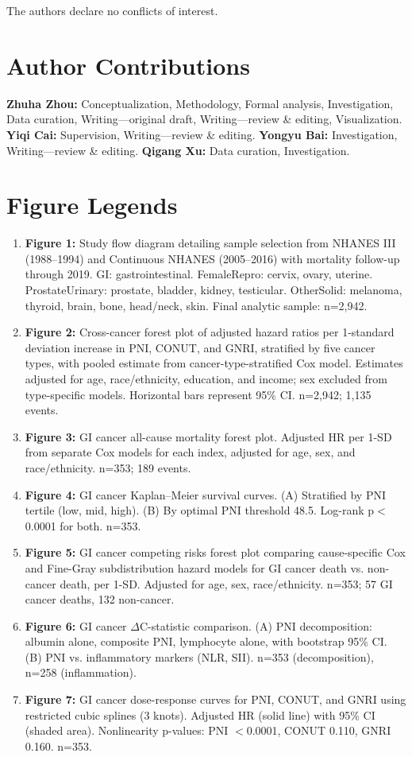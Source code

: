 \documentclass[review]{elsarticle}
\begin{document}
The authors declare no conflicts of interest.

\section*{Author Contributions}

\textbf{Zhuha Zhou:} Conceptualization, Methodology, Formal analysis, Investigation, Data curation, Writing---original draft, Writing---review \& editing, Visualization. \textbf{Yiqi Cai:} Supervision, Writing---review \& editing. \textbf{Yongyu Bai:} Investigation, Writing---review \& editing. \textbf{Qigang Xu:} Data curation, Investigation.

\section*{Figure Legends}

\begin{enumerate}
  \item \textbf{Figure 1:} Study flow diagram detailing sample selection from NHANES III (1988--1994) and Continuous NHANES (2005--2016) with mortality follow-up through 2019. GI: gastrointestinal. FemaleRepro: cervix, ovary, uterine. ProstateUrinary: prostate, bladder, kidney, testicular. OtherSolid: melanoma, thyroid, brain, bone, head/neck, skin. Final analytic sample: n=2,942.
  \item \textbf{Figure 2:} Cross-cancer forest plot of adjusted hazard ratios per 1-standard deviation increase in PNI, CONUT, and GNRI, stratified by five cancer types, with pooled estimate from cancer-type-stratified Cox model. Estimates adjusted for age, race/ethnicity, education, and income; sex excluded from type-specific models. Horizontal bars represent 95\% CI. n=2,942; 1,135 events.
  \item \textbf{Figure 3:} GI cancer all-cause mortality forest plot. Adjusted HR per 1-SD from separate Cox models for each index, adjusted for age, sex, and race/ethnicity. n=353; 189 events.
  \item \textbf{Figure 4:} GI cancer Kaplan--Meier survival curves. (A) Stratified by PNI tertile (low, mid, high). (B) By optimal PNI threshold 48.5. Log-rank p$<$0.0001 for both. n=353.
  \item \textbf{Figure 5:} GI cancer competing risks forest plot comparing cause-specific Cox and Fine-Gray subdistribution hazard models for GI cancer death vs. non-cancer death, per 1-SD. Adjusted for age, sex, race/ethnicity. n=353; 57 GI cancer deaths, 132 non-cancer.
  \item \textbf{Figure 6:} GI cancer $\Delta$C-statistic comparison. (A) PNI decomposition: albumin alone, composite PNI, lymphocyte alone, with bootstrap 95\% CI. (B) PNI vs. inflammatory markers (NLR, SII). n=353 (decomposition), n=258 (inflammation).
  \item \textbf{Figure 7:} GI cancer dose-response curves for PNI, CONUT, and GNRI using restricted cubic splines (3 knots). Adjusted HR (solid line) with 95\% CI (shaded area). Nonlinearity p-values: PNI $<$0.0001, CONUT 0.110, GNRI 0.160. n=353.
\end{enumerate}
\end{document}
